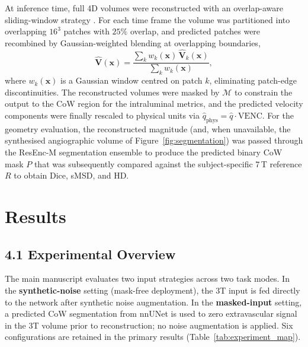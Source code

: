 \documentclass[11pt]{article}
\begin{document}
At inference time, full 4D volumes were reconstructed with an
overlap-aware sliding-window strategy
\cite{cardoso2022monai,ronneberger2015unet}. For each time frame the
volume was partitioned into overlapping $16^{3}$ patches with $25\%$
overlap, and predicted patches were recombined by Gaussian-weighted
blending at overlapping boundaries,
\begin{equation}
    \hat{\mathbf{V}}(\mathbf{x})
    = \frac{\sum_{k} w_{k}(\mathbf{x})\,\hat{\mathbf{V}}_{k}(\mathbf{x})}
           {\sum_{k} w_{k}(\mathbf{x})},
\end{equation}
where $w_k(\mathbf{x})$ is a Gaussian window centred on patch $k$,
eliminating patch-edge discontinuities. The reconstructed volumes were
masked by $\mathcal{M}$ to constrain the output to the CoW region for
the intraluminal metrics, and the predicted velocity components were
finally rescaled to physical units via
$\hat{q}_{\text{phys}} = \hat{q}\cdot\mathrm{VENC}$. For the geometry
evaluation, the reconstructed magnitude (and, when unavailable, the
synthesised angiographic volume of Figure~\ref{fig:segmentation}) was passed
through the ResEnc-M segmentation ensemble to produce the predicted
binary CoW mask $P$ that was subsequently compared against the
subject-specific 7\,T reference $R$ to obtain Dice, sMSD, and HD.



\section*{Results}

\subsection*{4.1 Experimental Overview}

The main manuscript evaluates two input strategies across two task modes. In the
\textbf{synthetic-noise} setting (mask-free deployment), the 3T input is fed directly to the
network after synthetic noise augmentation. In the \textbf{masked-input} setting, a
predicted CoW segmentation from nnUNet is used to zero extravascular signal in the 3T volume
prior to reconstruction; no noise augmentation is applied. Six configurations are retained
in the primary results (Table~\ref{tab:experiment_map}).
\end{document}
